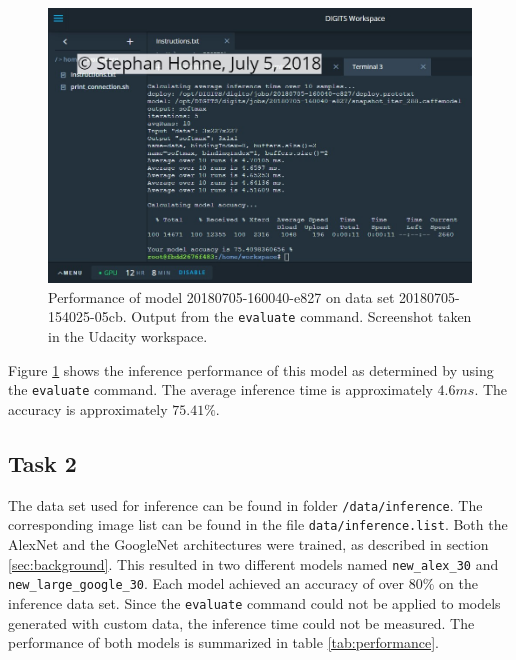 \documentclass[10pt, journal, compsoc]{IEEEtran}
\newcommand{\an}{AlexNet }
\newcommand{\gn}{GoogleNet }
\begin{document}
\begin{figure}[htpb]
      \centering
      \includegraphics[width=\textwidth]{images/default_dataset/evaluation.PNG}
      \caption{Performance of model 20180705-160040-e827 on data set 20180705-154025-05cb. Output from the \texttt{evaluate} command. Screenshot taken in the Udacity workspace.}
      \label{fig:evaluation}
\end{figure}

Figure \ref{fig:evaluation} shows the inference performance of this model as determined by using the \texttt{evaluate} command. The average inference time  is approximately $4.6 ms$. The accuracy is approximately $75.41\%$.

\subsection{Task 2}
The data set used for inference can be found in folder \texttt{/data/inference}. The corresponding image list can be found in the file \texttt{data/inference.list}. Both the \an and the \gn architectures were trained, as described in section \ref{sec:background}. This resulted in two different models named \texttt{new\_alex\_30} and \texttt{new\_large\_google\_30}. Each model achieved an accuracy of over $80\%$ on the inference data set. Since the \texttt{evaluate} command could not be applied to models generated with custom data, the inference time could not be measured. The performance of both models is summarized in table \ref{tab:performance}.
\end{document}
